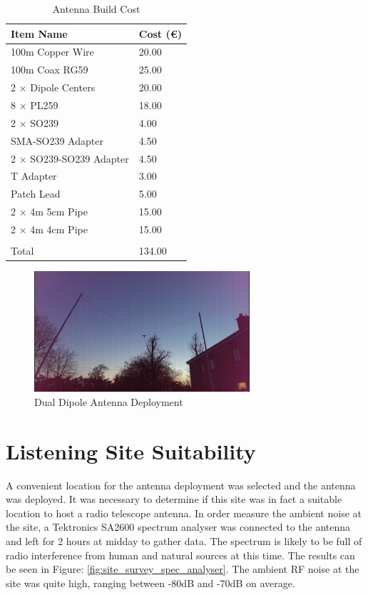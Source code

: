 \documentclass[runningheads,a4paper]{llncs}
\begin{document}
%
\begin{table}
  \centering
  \begin{tabular}{p{8cm} l}
    \toprule
    Item Name & Cost (\euro) \\ \midrule
    100m Copper Wire & 20.00  \\
    100m Coax RG59 & 25.00  \\
    2 $\times$ Dipole Centers & 20.00 \\
    8 $\times$ PL259 & 18.00 \\
    2 $\times$ SO239 & 4.00 \\
    SMA-SO239 Adapter & 4.50 \\
    2 $\times$ SO239-SO239 Adapter & 4.50 \\
    T Adapter & 3.00 \\
    Patch Lead & 5.00 \\
    2 $\times$ 4m 5cm Pipe & 15.00 \\
    2 $\times$ 4m 4cm Pipe & 15.00 \\
    \bottomrule
    \\
    Total & 134.00
  \end{tabular}
  \caption{Antenna Build Cost}
  \label{tab:antenna_build_cost}
\end{table}
%

%
\begin{figure}[here]
	\centering
	\includegraphics[width=8cm]{images/32}
	\caption{Dual Dipole Antenna Deployment}
	\label{fig:dual_dipole_deployed}
\end{figure}
%

\newpage
\section*{Listening Site Suitability}
A convenient location for the antenna deployment was selected and the antenna was deployed. It was necessary to determine if this site was in fact a suitable location to host a radio telescope antenna. In order measure the ambient noise at the site, a Tektronics SA2600 spectrum analyser was connected to the antenna and left for 2 hours at midday to gather data. The spectrum is likely to be full of radio interference from human and natural sources at this time. The results can be seen in Figure: \ref{fig:site_survey_spec_analyser}. The ambient \gls{RF} noise at the site was quite high, ranging between -80dB and -70dB on average. 
\end{document}
